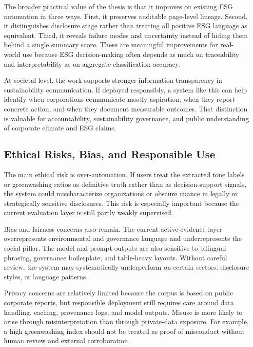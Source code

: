 \documentclass[english, online, cse, master]{dithesis}
\begin{document}
The broader practical value of the thesis is that it improves on existing ESG automation in three ways. First, it preserves auditable page-level lineage. Second, it distinguishes disclosure stage rather than treating all positive ESG language as equivalent. Third, it reveals failure modes and uncertainty instead of hiding them behind a single summary score. These are meaningful improvements for real-world use because ESG decision-making often depends as much on traceability and interpretability as on aggregate classification accuracy.

At societal level, the work supports stronger information transparency in sustainability communication. If deployed responsibly, a system like this can help identify when corporations communicate mostly aspiration, when they report concrete action, and when they document measurable outcomes. That distinction is valuable for accountability, sustainability governance, and public understanding of corporate climate and ESG claims.

\subsection{Ethical Risks, Bias, and Responsible Use}

The main ethical risk is over-automation. If users treat the extracted tone labels or greenwashing ratios as definitive truth rather than as decision-support signals, the system could mischaracterize organizations or obscure nuance in legally or strategically sensitive disclosures. This risk is especially important because the current evaluation layer is still partly weakly supervised.

Bias and fairness concerns also remain. The current active evidence layer overrepresents environmental and governance language and underrepresents the social pillar. The model and prompt outputs are also sensitive to bilingual phrasing, governance boilerplate, and table-heavy layouts. Without careful review, the system may systematically underperform on certain sectors, disclosure styles, or language patterns.

Privacy concerns are relatively limited because the corpus is based on public corporate reports, but responsible deployment still requires care around data handling, caching, provenance logs, and model outputs. Misuse is more likely to arise through misinterpretation than through private-data exposure. For example, a high greenwashing index should not be treated as proof of misconduct without human review and external corroboration.
\end{document}
